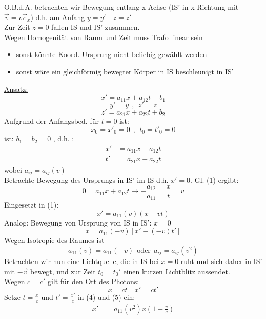 \documentclass[titlepage,12pt,a4paper,ngerman]{report}
\newcommand{\tx}[1]{\textrm{#1}}
\begin{document}
{O.B.d.A. betrachten wir Bewegung entlang x-Achse (IS' in x-Richtung mit $ \vec{v} = v \vec{e}_x $) d.h. am Anfang $ y = y' \quad z = z' $\\
Zur Zeit $ z=0 $ fallen IS und IS' zusammen.\\[5pt]
Wegen Homogenität von Raum und Zeit muss Trafo \underline{linear} sein
\begin{itemize}
	\item sonst könnte Koord. Ursprung nicht beliebig gewählt werden
	\item sonst wäre ein gleichförmig bewegter Körper in IS beschleunigt in IS' 
\end{itemize}
\underline{Ansatz:} 
$$x' = a_{11} x + a_{12} t + b_1$$
$$y' = y \ \ , \ \ z' = z$$
$$z' = a_{21} x + a_{22} t + b_2$$
Aufgrund der Anfangsbed. für $ t=0 $ ist:
$$x_0 = x'_0 = 0 \ \ , \ \ t_0 = t'_0 = 0$$
ist: $b_1 = b_2 = 0$ , d.h. :
\begin{align}
x' &= a_{11} x + a_{12} t \tag{1}\\
t' &= a_{21} x + a_{22} t \tag{2}
\end{align}
wobei $ a_{ij} = a_{ij}(v) $\\[5pt]
Betrachte Bewegung des Ursprungs in IS' im IS d.h. $ x' = 0 $. Gl. (1) ergibt:
\begin{equation*}
0 = a_{11} x + a_{12} t \rightarrow - \frac{a_{12}}{a_{11}} = \frac{x}{t} = v \tag{3}
\end{equation*}
Eingesetzt in (1):
\begin{equation*}
x' = a_{11}(v) (x-vt) \tag{4}
\end{equation*}
Analog: Bewegung von Ursprung von IS in IS': $ x = 0 $
\begin{equation*}
x = a_{11}(-v) [x' - (-v) t'] \tag{5}
\end{equation*}
Wegen Isotropie des Raumes ist
\begin{equation*}
a_{11}(v) = a_{11}(-v) \ \ \tx{oder} \ \ a_{ij} = a_{ij}(v^2)
\end{equation*}
Betrachten wir nun eine Lichtquelle, die in IS bei $ x=0 $ ruht und sich daher in IS' mit $ -\vec{v} $ bewegt, und zur Zeit $ t_0 = t_0' $ einen kurzen Lichtblitz aussendet.\\
Wegen $ c = c' $ gilt für den Ort des Photons:
\begin{equation*}
x = ct \quad x' = ct' \tag{6}
\end{equation*}
Setze $ t = \frac{x}{c} $ und $ t' = \frac{x'}{c} $ in (4) und (5) ein:
\begin{align*}
x' &= a_{11}(v^2) x(1-\frac{v}{c}) \tag{7} \\

\end{align*}}
\end{document}
